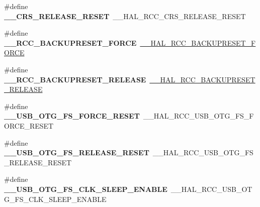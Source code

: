 \begin{DoxyCompactItemize}
\item 
\hypertarget{group___h_a_l___r_c_c___aliased_gaee653fe1285dc71584a287f1752deef6}{\#define {\bfseries \-\_\-\-\_\-\-C\-R\-S\-\_\-\-R\-E\-L\-E\-A\-S\-E\-\_\-\-R\-E\-S\-E\-T}~\-\_\-\-\_\-\-H\-A\-L\-\_\-\-R\-C\-C\-\_\-\-C\-R\-S\-\_\-\-R\-E\-L\-E\-A\-S\-E\-\_\-\-R\-E\-S\-E\-T}\label{group___h_a_l___r_c_c___aliased_gaee653fe1285dc71584a287f1752deef6}

\item 
\hypertarget{group___h_a_l___r_c_c___aliased_ga717fc2d87d7b55be19d505a1c55507c5}{\#define {\bfseries \-\_\-\-\_\-\-R\-C\-C\-\_\-\-B\-A\-C\-K\-U\-P\-R\-E\-S\-E\-T\-\_\-\-F\-O\-R\-C\-E}~\hyperlink{group___r_c_c___r_t_c___clock___configuration_ga3bf7da608ff985873ca8e248fb1dc4f0}{\-\_\-\-\_\-\-H\-A\-L\-\_\-\-R\-C\-C\-\_\-\-B\-A\-C\-K\-U\-P\-R\-E\-S\-E\-T\-\_\-\-F\-O\-R\-C\-E}}\label{group___h_a_l___r_c_c___aliased_ga717fc2d87d7b55be19d505a1c55507c5}

\item 
\hypertarget{group___h_a_l___r_c_c___aliased_ga16e2165e9541a9ffbf34614eb6ef91c2}{\#define {\bfseries \-\_\-\-\_\-\-R\-C\-C\-\_\-\-B\-A\-C\-K\-U\-P\-R\-E\-S\-E\-T\-\_\-\-R\-E\-L\-E\-A\-S\-E}~\hyperlink{group___r_c_c___r_t_c___clock___configuration_ga14f32622c65f4ae239ba8cb00d510321}{\-\_\-\-\_\-\-H\-A\-L\-\_\-\-R\-C\-C\-\_\-\-B\-A\-C\-K\-U\-P\-R\-E\-S\-E\-T\-\_\-\-R\-E\-L\-E\-A\-S\-E}}\label{group___h_a_l___r_c_c___aliased_ga16e2165e9541a9ffbf34614eb6ef91c2}

\item 
\hypertarget{group___h_a_l___r_c_c___aliased_ga4cbf3d0cd9c1f29b7f38cd672a7f81a3}{\#define {\bfseries \-\_\-\-\_\-\-U\-S\-B\-\_\-\-O\-T\-G\-\_\-\-F\-S\-\_\-\-F\-O\-R\-C\-E\-\_\-\-R\-E\-S\-E\-T}~\-\_\-\-\_\-\-H\-A\-L\-\_\-\-R\-C\-C\-\_\-\-U\-S\-B\-\_\-\-O\-T\-G\-\_\-\-F\-S\-\_\-\-F\-O\-R\-C\-E\-\_\-\-R\-E\-S\-E\-T}\label{group___h_a_l___r_c_c___aliased_ga4cbf3d0cd9c1f29b7f38cd672a7f81a3}

\item 
\hypertarget{group___h_a_l___r_c_c___aliased_ga0c1425084511fd2205b412ee47165041}{\#define {\bfseries \-\_\-\-\_\-\-U\-S\-B\-\_\-\-O\-T\-G\-\_\-\-F\-S\-\_\-\-R\-E\-L\-E\-A\-S\-E\-\_\-\-R\-E\-S\-E\-T}~\-\_\-\-\_\-\-H\-A\-L\-\_\-\-R\-C\-C\-\_\-\-U\-S\-B\-\_\-\-O\-T\-G\-\_\-\-F\-S\-\_\-\-R\-E\-L\-E\-A\-S\-E\-\_\-\-R\-E\-S\-E\-T}\label{group___h_a_l___r_c_c___aliased_ga0c1425084511fd2205b412ee47165041}

\item 
\hypertarget{group___h_a_l___r_c_c___aliased_ga86e49075f8526ea61ca22a6f83ca65d7}{\#define {\bfseries \-\_\-\-\_\-\-U\-S\-B\-\_\-\-O\-T\-G\-\_\-\-F\-S\-\_\-\-C\-L\-K\-\_\-\-S\-L\-E\-E\-P\-\_\-\-E\-N\-A\-B\-L\-E}~\-\_\-\-\_\-\-H\-A\-L\-\_\-\-R\-C\-C\-\_\-\-U\-S\-B\-\_\-\-O\-T\-G\-\_\-\-F\-S\-\_\-\-C\-L\-K\-\_\-\-S\-L\-E\-E\-P\-\_\-\-E\-N\-A\-B\-L\-E}\label{group___h_a_l___r_c_c___aliased_ga86e49075f8526ea61ca22a6f83ca65d7}


\end{DoxyCompactItemize}
